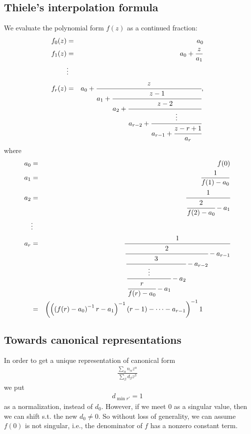 \documentclass[11pt]{book}
\begin{document}
\subsection{Thiele's interpolation formula}
We evaluate the polynomial form $f(z)$ as a continued fraction:
\begin{eqnarray}
f_0(z) &=& a_0 \\
f_1(z) &=& a_0 + \frac{z}{a_1} \\
\nonumber
&\vdots& \\
f_r(z) &=& a_0 + \cfrac{z}{a_1 + \cfrac{z-1}{a_2 + \cfrac{z- 2}{a_{r-2} + \cfrac{\vdots}{a_{r-1} + \cfrac{z-r+1}{a_r}}}}},
\end{eqnarray}
where
\begin{eqnarray}
a_0 &=& f(0) \\
a_1 &=& \frac{1}{f(1) - a_0}\\
a_2 &=& \cfrac{1}{\cfrac{2}{f(2)-a_0} - a_1} \\
\nonumber
&\vdots& \\
a_r &=&\cfrac{1}{\cfrac{2}{\cfrac{3}{\cfrac{\vdots}{\cfrac{r}{f(r)-a_0}-a_1}-a_2} - a_{r-2}} - a_{r-1}} \\
&=& \left( \left( \left( f(r)-a_0 \right)^{-1} r - a_1 \right)^{-1} (r - 1) - \cdots - a_{r-1} \right)^{-1} 1 \qquad\qquad
\end{eqnarray}


\subsection{Towards canonical representations}
In order to get a unique representation of canonical form
\begin{eqnarray}
\frac{\sum_\alpha n_\alpha z^\alpha}{\sum_\beta d_\beta z^\beta}
\end{eqnarray}
we put
\begin{eqnarray}
d_{\min r'} = 1
\end{eqnarray}
as a normalization, instead of $d_0$.
However, if we meet 0 as a singular value, then we can shift s.t. the new $d_0 \neq 0$.
So without loss of generality, we can assume $f(0)$ is not singular, i.e., the denominator of $f$ has a nonzero constant term.
\end{document}
